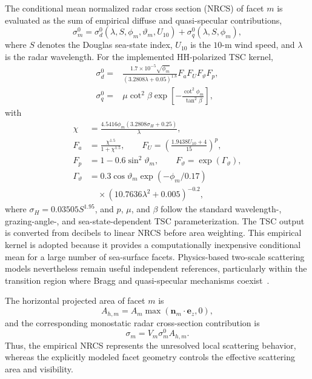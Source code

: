 The conditional mean normalized radar cross section (NRCS) of facet $m$ is evaluated as the sum of empirical diffuse and quasi-specular contributions,
\begin{equation}
\sigma_m^0
=
\sigma_d^0
\left(
\lambda,S,\phi_m,\vartheta_m,U_{10}
\right)
+
\sigma_q^0
\left(
\lambda,S,\phi_m
\right),
\label{eq:tsc_total_nrcs}
\end{equation}
where $S$ denotes the Douglas sea-state index, $U_{10}$ is the $10$-m wind speed, and $\lambda$ is the radar wavelength. For the implemented HH-polarized TSC kernel,
\begin{align}
\sigma_d^0
={}&
\frac{
1.7\times10^{-5}\sqrt{\phi_m}
}{
(3.2808\lambda+0.05)^{1.8}
}
F_aF_UF_\vartheta F_p,
\nonumber\\
\sigma_q^0
={}&
\mu\cot^2\beta
\exp
\left[
-\frac{\cot^2\phi_m}{\tan^2\beta}
\right],
\label{eq:tsc_diffuse_quasi_terms}
\end{align}
with
\begin{align}
\chi
&=
\frac{
4.5416\phi_m
(3.2808\sigma_H+0.25)
}{
\lambda
},
\nonumber\\
F_a
&=
\frac{\chi^{1.5}}{1+\chi^{1.5}},
\qquad
F_U
=
\left(
\frac{1.9438U_{10}+4}{15}
\right)^p,
\nonumber\\
F_p
&=
1-0.6\sin^2\vartheta_m,
\qquad
F_\vartheta
=
\exp(\Gamma_\vartheta),
\nonumber\\
\Gamma_\vartheta
&=
0.3\cos\vartheta_m
\exp(-\phi_m/0.17)
\nonumber\\
&\quad\times
(10.7636\lambda^2+0.005)^{-0.2},
\label{eq:tsc_empirical_factors}
\end{align}
where $\sigma_H=0.03505S^{1.95}$, and $p$, $\mu$, and $\beta$ follow the standard wavelength-, grazing-angle-, and sea-state-dependent TSC parameterization. The TSC output is converted from decibels to linear NRCS before area weighting. This empirical kernel is adopted because it provides a computationally inexpensive conditional mean for a large number of sea-surface facets. Physics-based two-scale scattering models nevertheless remain useful independent references, particularly within the transition region where Bragg and quasi-specular mechanisms coexist~\cite{ye2022improvedTSM}.

The horizontal projected area of facet $m$ is
\begin{equation}
A_{h,m}
=
A_m
\max
\left(
\boldsymbol{n}_m\cdot\boldsymbol{e}_z,0
\right),
\label{eq:facet_projected_area}
\end{equation}
and the corresponding monostatic radar cross-section contribution is
\begin{equation}
\sigma_m
=
V_m\sigma_m^0A_{h,m}.
\label{eq:facet_rcs_contribution}
\end{equation}
Thus, the empirical NRCS represents the unresolved local scattering behavior, whereas the explicitly modeled facet geometry controls the effective scattering area and visibility.

